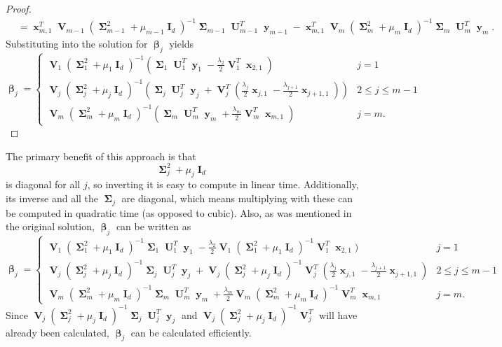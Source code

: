 \documentclass[12pt]{article}
\DeclareMathOperator{\bx}{\mathbf{x}}
\DeclareMathOperator{\by}{\mathbf{y}}
\DeclareMathOperator{\bI}{\mathbf{I}}
\DeclareMathOperator{\bU}{\mathbf{U}}
\DeclareMathOperator{\bV}{\mathbf{V}}
\DeclareMathOperator{\bbeta}{\boldsymbol{\beta}}
\DeclareMathOperator{\bSigma}{\mathbf{\Sigma}}
\begin{document}
\begin{proof}
\begin{align*}
& = \bx_{m,1}^T\bV_{m-1}(\bSigma_{m-1}^2+\mu_{m-1}\bI_d)^{-1}\bSigma_{m-1} \bU_{m-1}^T \by_{m-1}-\bx_{m,1}^T\bV_{m}(\bSigma_{m}^2+\mu_{m}\bI_d)^{-1}\bSigma_m \bU_m^T\by_m.
\end{align*}
Substituting into the solution for $\bbeta_j$ yields
\begin{equation} \label{eqn:beta_svd}
\bbeta_j=\begin{cases}
\bV_1(\bSigma_1^2+\mu_1\bI_d)^{-1}(\bSigma_1 \bU_1^T \by_1 -\frac{\lambda_{2}}{2}\bV_1^T\bx_{2, 1}) & j=1 \\
\bV_j(\bSigma_j^2+\mu_j\bI_d)^{-1}(\bSigma_j \bU_j^T \by_j + \bV_j^T(\frac{\lambda_j}{2}\bx_{j, 1}-\frac{\lambda_{j+1}}{2}\bx_{j+1, 1})) & 2 \leq j \leq m-1 \\
\bV_m(\bSigma_m^2+\mu_m\bI_d)^{-1}(\bSigma_m \bU_m^T \by_m + \frac{\lambda_m}{2}\bV_m^T\bx_{m, 1}) & j=m. \end{cases}
\end{equation}
\end{proof}

The primary benefit of this approach is that 
$$\bSigma_j^2+\mu_j\bI_d$$
is diagonal for all $j$, so inverting it is easy to compute in linear time. Additionally, its inverse and all the $\bSigma_j$ are diagonal, which means multiplying with these can be computed in quadratic time (as opposed to cubic). Also, as was mentioned in the original solution, $\bbeta_j$ can be written as 
$$\bbeta_j=\begin{cases}
\bV_1(\bSigma_1^2+\mu_1\bI_d)^{-1}\bSigma_1 \bU_1^T \by_1 -\frac{\lambda_{2}}{2}\bV_1(\bSigma_1^2+\mu_1\bI_d)^{-1}\bV_1^T\bx_{2, 1}) & j=1 \\
\bV_j(\bSigma_j^2+\mu_j\bI_d)^{-1}\bSigma_j \bU_j^T \by_j + \bV_j(\bSigma_j^2+\mu_j\bI_d)^{-1}\bV_j^T(\frac{\lambda_j}{2}\bx_{j, 1}-\frac{\lambda_{j+1}}{2}\bx_{j+1, 1}) & 2 \leq j \leq m-1 \\
\bV_m(\bSigma_m^2+\mu_m\bI_d)^{-1}\bSigma_m \bU_m^T \by_m + \frac{\lambda_m}{2}\bV_m(\bSigma_m^2+\mu_m\bI_d)^{-1}\bV_m^T\bx_{m, 1} & j=m. \end{cases}$$
Since $\bV_j(\bSigma_j^2+\mu_j\bI_d)^{-1}\bSigma_j \bU_j^T \by_j$ and $\bV_j(\bSigma_j^2+\mu_j\bI_d)^{-1}\bV_j^T$ will have already been calculated, $\bbeta_j$ can be calculated efficiently.
\end{document}
